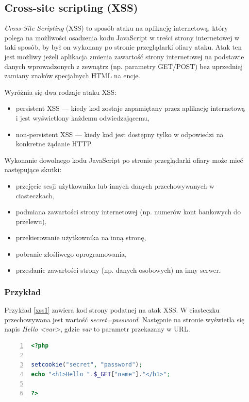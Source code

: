 \documentclass[11pt,a4paper,polish,thesis]{dcsbook}
\begin{document}
\subsection{Cross-site scripting (XSS)}
\textit{Cross-Site Scripting} (XSS) to sposób ataku na aplikację internetową, który polega na możliwości osadzenia kodu JavaScript w treści strony internetowej w taki sposób, by był on wykonany po stronie przeglądarki ofiary ataku. Atak ten jest możliwy jeżeli aplikacja zmienia zawartość strony internetowej na podstawie danych wprowadzonych z zewnątrz (np. parametry GET/POST) bez uprzedniej zamiany znaków specjalnych HTML na encje. 

Wyróżnia się dwa rodzaje ataku XSS:
\begin{itemize}
\item persistent XSS --- kiedy kod zostaje zapamiętany przez aplikację internetową i jest wyświetlony każdemu odwiedzającemu,
\item non-persistent XSS --- kiedy kod jest dostępny tylko w odpowiedzi na konkretne żądanie HTTP.
\end{itemize}

Wykonanie dowolnego kodu JavaScript po stronie przeglądarki ofiary może mieć następujące skutki:
\begin{itemize}
\item przejęcie sesji użytkownika lub innych danych przechowywanych w ciasteczkach,
\item podmiana zawartości strony internetowej (np. numerów kont bankowych do przelewu),
\item przekierowanie użytkownika na inną stronę,
\item pobranie złośliwego oprogramowania,
\item przesłanie zawartości strony (np. danych osobowych) na inny serwer.
\end{itemize}

\subsubsection*{Przykład}
Przykład \ref{xss1} zawiera kod strony podatnej na atak XSS. W ciasteczku przechowywana jest wartość \textit{secret=password}. Następnie na stronie wyświetla się napis \textit{Hello <var>}, gdzie \textit{var} to parametr przekazany w URL.

\begin{lstlisting}[language=php,frame=single,caption=przykładowy kod strony podatnej na XSS,label=xss1,numbers=left]
<?php

setcookie("secret", "password");
echo "<h1>Hello ".$_GET["name"]."</h1>";

?>
\end{lstlisting}
\end{document}
